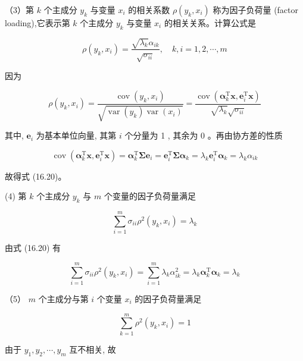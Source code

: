 \documentclass[10pt]{article}
\begin{document}
（3）第 $k$ 个主成分 $y_{k}$ 与变量 $x_{i}$ 的相关系数 $\rho\left(y_{k}, x_{i}\right)$ 称为因子负荷量 (factor loading),它表示第 $k$ 个主成分 $y_{k}$ 与变量 $x_{i}$ 的相关关系。计算公式是


\begin{equation*}
\rho\left(y_{k}, x_{i}\right)=\frac{\sqrt{\lambda_{k}} \alpha_{i k}}{\sqrt{\sigma_{i i}}}, \quad k, i=1,2, \cdots, m \tag{16.20}
\end{equation*}


因为

$$
\rho\left(y_{k}, x_{i}\right)=\frac{\operatorname{cov}\left(y_{k}, x_{i}\right)}{\sqrt{\operatorname{var}\left(y_{k}\right) \operatorname{var}\left(x_{i}\right)}}=\frac{\operatorname{cov}\left(\boldsymbol{\alpha}_{k}^{\mathrm{T}} \boldsymbol{x}, \boldsymbol{e}_{i}^{\mathrm{T}} \boldsymbol{x}\right)}{\sqrt{\lambda_{k}} \sqrt{\sigma_{i i}}}
$$

其中, $\boldsymbol{e}_{i}$ 为基本单位向量, 其第 $i$ 个分量为 1 , 其余为 0 。再由协方差的性质

$$
\operatorname{cov}\left(\boldsymbol{\alpha}_{k}^{\mathrm{T}} \boldsymbol{x}, \boldsymbol{e}_{i}^{\mathrm{T}} \boldsymbol{x}\right)=\boldsymbol{\alpha}_{k}^{\mathrm{T}} \boldsymbol{\Sigma} \boldsymbol{e}_{i}=\boldsymbol{e}_{i}^{\mathrm{T}} \boldsymbol{\Sigma} \boldsymbol{\alpha}_{k}=\lambda_{k} \boldsymbol{e}_{i}^{\mathrm{T}} \boldsymbol{\alpha}_{k}=\lambda_{k} \alpha_{i k}
$$

故得式 (16.20)。

(4) 第 $k$ 个主成分 $y_{k}$ 与 $m$ 个变量的因子负荷量满足


\begin{equation*}
\sum_{i=1}^{m} \sigma_{i i} \rho^{2}\left(y_{k}, x_{i}\right)=\lambda_{k} \tag{16.21}
\end{equation*}


由式 (16.20) 有

$$
\sum_{i=1}^{m} \sigma_{i i} \rho^{2}\left(y_{k}, x_{i}\right)=\sum_{i=1}^{m} \lambda_{k} \alpha_{i k}^{2}=\lambda_{k} \boldsymbol{\alpha}_{k}^{\mathrm{T}} \boldsymbol{\alpha}_{k}=\lambda_{k}
$$

（5） $m$ 个主成分与第 $i$ 个变量 $x_{i}$ 的因子负荷量满足


\begin{equation*}
\sum_{k=1}^{m} \rho^{2}\left(y_{k}, x_{i}\right)=1 \tag{16.22}
\end{equation*}


由于 $y_{1}, y_{2}, \cdots, y_{m}$ 互不相关, 故
\end{document}
